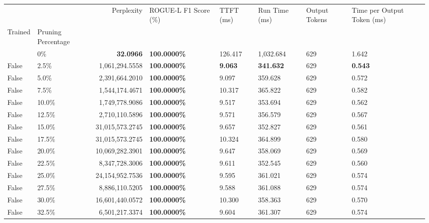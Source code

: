 \begin{table}[H]
\label{tab:evaluation-pipeline-1-untrained}
\begin{tabular}{|m{} | m{} | r | R{0.13\textwidth} | R{0.09\textwidth} | R{0.09\textwidth} | R{0.09\textwidth} | R{0.11\textwidth} |}
\toprule
 &  & Perplexity & ROGUE-L F1 Score (\%) & TTFT (ms) & Run Time (ms) & Output Tokens & Time per Output Token (ms) \\
Trained & Pruning Percentage &  &  &  &  &  &  \\
\midrule
 & 0\% & \bfseries 32.0966 & \bfseries 100.0000\% & 126.417 & 1,032.684 & 629 & 1.642 \\
False & 2.5\% & 1,061,294.5558 & \bfseries \color{red} 100.0000\% & \bfseries \color{red} 9.063 & \bfseries \color{red} 341.632 & 629 & \bfseries \color{red} 0.543 \\
False & 5.0\% & 2,391,664.2010 & \bfseries \color{red} 100.0000\% & 9.097 & 359.628 & 629 & 0.572 \\
False & 7.5\% & 1,544,174.4671 & \bfseries \color{red} 100.0000\% & 10.317 & 365.822 & 629 & 0.582 \\
False & 10.0\% & 1,749,778.9086 & \bfseries \color{red} 100.0000\% & 9.517 & 353.694 & 629 & 0.562 \\
False & 12.5\% & 2,710,110.5896 & \bfseries \color{red} 100.0000\% & 9.571 & 356.579 & 629 & 0.567 \\
False & 15.0\% & 31,015,573.2745 & \bfseries \color{red} 100.0000\% & 9.657 & 352.827 & 629 & 0.561 \\
False & 17.5\% & 31,015,573.2745 & \bfseries \color{red} 100.0000\% & 10.324 & 364.899 & 629 & 0.580 \\
False & 20.0\% & 10,069,282.3901 & \bfseries \color{red} 100.0000\% & 9.647 & 358.069 & 629 & 0.569 \\
False & 22.5\% & 8,347,728.3006 & \bfseries \color{red} 100.0000\% & 9.611 & 352.545 & 629 & 0.560 \\
False & 25.0\% & 24,154,952.7536 & \bfseries \color{red} 100.0000\% & 9.595 & 361.021 & 629 & 0.574 \\
False & 27.5\% & 8,886,110.5205 & \bfseries \color{red} 100.0000\% & 9.588 & 361.088 & 629 & 0.574 \\
False & 30.0\% & 16,601,440.0572 & \bfseries \color{red} 100.0000\% & 10.300 & 358.363 & 629 & 0.570 \\
False & 32.5\% & 6,501,217.3374 & \bfseries \color{red} 100.0000\% & 9.604 & 361.307 & 629 & 0.574 \\

\end{tabular}
\end{table}

